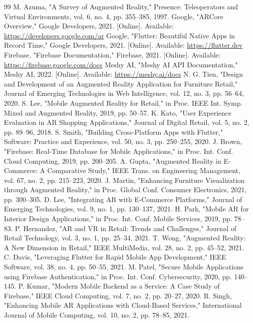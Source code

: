 \documentclass[12pt, a4paper]{article}
\begin{document}
\begin{thebibliography}{99}
 M. Azuma, "A Survey of Augmented Reality," Presence: Teleoperators and Virtual Environments, vol. 6, no. 4, pp. 355--385, 1997.
 Google, "ARCore Overview," Google Developers, 2021. [Online]. Available: \url{https://developers.google.com/ar}
 Google, "Flutter: Beautiful Native Apps in Record Time," Google Developers, 2021. [Online]. Available: \url{https://flutter.dev}
 Firebase, "Firebase Documentation," Firebase, 2021. [Online]. Available: \url{https://firebase.google.com/docs}
 Meshy AI, "Meshy AI API Documentation," Meshy AI, 2022. [Online]. Available: \url{https://meshy.ai/docs}
 N. G. Tien, "Design and Development of an Augmented Reality Application for Furniture Retail," Journal of Emerging Technologies in Web Intelligence, vol. 12, no. 3, pp. 56--64, 2020.
 S. Lee, "Mobile Augmented Reality for Retail," in Proc. IEEE Int. Symp. Mixed and Augmented Reality, 2019, pp. 50--57.
 K. Kato, "User Experience Evaluation in AR Shopping Applications," Journal of Digital Retail, vol. 5, no. 2, pp. 89--96, 2018.
 S. Smith, "Building Cross-Platform Apps with Flutter," Software: Practice and Experience, vol. 50, no. 3, pp. 250--255, 2020.
 J. Brown, "Firebase: Real-Time Database for Mobile Applications," in Proc. Int. Conf. Cloud Computing, 2019, pp. 200--205.
 A. Gupta, "Augmented Reality in E-Commerce: A Comparative Study," IEEE Trans. on Engineering Management, vol. 67, no. 2, pp. 215--223, 2020.
 J. Martin, "Enhancing Furniture Visualization through Augmented Reality," in Proc. Global Conf. Consumer Electronics, 2021, pp. 300--305.
 D. Lee, "Integrating AR with E-Commerce Platforms," Journal of Emerging Technologies, vol. 9, no. 1, pp. 130--137, 2021.
 H. Park, "Mobile AR for Interior Design Applications," in Proc. Int. Conf. Mobile Services, 2019, pp. 78--83.
 P. Hernandez, "AR and VR in Retail: Trends and Challenges," Journal of Retail Technology, vol. 3, no. 1, pp. 25--34, 2021.
 T. Wong, "Augmented Reality: A New Dimension in Retail," IEEE MultiMedia, vol. 28, no. 2, pp. 45--52, 2021.
 C. Davis, "Leveraging Flutter for Rapid Mobile App Development," IEEE Software, vol. 38, no. 4, pp. 50--55, 2021.
 M. Patel, "Secure Mobile Applications using Firebase Authentication," in Proc. Int. Conf. Cybersecurity, 2020, pp. 140--145.
 P. Kumar, "Modern Mobile Backend as a Service: A Case Study of Firebase," IEEE Cloud Computing, vol. 7, no. 2, pp. 20--27, 2020.
 R. Singh, "Enhancing Mobile AR Applications with Cloud-Based Services," International Journal of Mobile Computing, vol. 10, no. 2, pp. 78--85, 2021.
\end{thebibliography}
\end{document}
